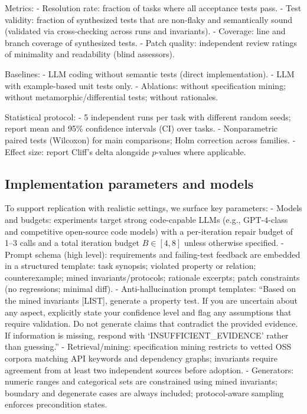 \documentclass[10pt,twocolumn]{article}
\begin{document}
Metrics:
- Resolution rate: fraction of tasks where all acceptance tests pass.
- Test validity: fraction of synthesized tests that are non-flaky and semantically sound (validated via cross-checking across runs and invariants).
- Coverage: line and branch coverage of synthesized tests.
- Patch quality: independent review ratings of minimality and readability (blind assessors).

Baselines:
- LLM coding without semantic tests (direct implementation).
- LLM with example-based unit tests only.
- Ablations: without specification mining; without metamorphic/differential tests; without rationales.

Statistical protocol:
- 5 independent runs per task with different random seeds; report mean and 95\% confidence intervals (CI) over tasks.
- Nonparametric paired tests (Wilcoxon) for main comparisons; Holm correction across families.
- Effect size: report Cliff's delta alongside $p$-values where applicable.

\subsection{Implementation parameters and models}
To support replication with realistic settings, we surface key parameters:
- Models and budgets: experiments target strong code-capable LLMs (e.g., GPT-4-class and competitive open-source code models) with a per-iteration repair budget of 1–3 calls and a total iteration budget $B \in [4,8]$ unless otherwise specified.
- Prompt schema (high level): requirements and failing-test feedback are embedded in a structured template: task synopsis; violated property or relation; counterexample; mined invariants/protocols; rationale excerpts; patch constraints (no regressions; minimal diff).
- Anti-hallucination prompt templates: ``Based on the mined invariants [LIST], generate a property test. If you are uncertain about any aspect, explicitly state your confidence level and flag any assumptions that require validation. Do not generate claims that contradict the provided evidence. If information is missing, respond with `INSUFFICIENT\_EVIDENCE' rather than guessing.''
- Retrieval/mining: specification mining restricts to vetted OSS corpora matching API keywords and dependency graphs; invariants require agreement from at least two independent sources before adoption.
- Generators: numeric ranges and categorical sets are constrained using mined invariants; boundary and degenerate cases are always included; protocol-aware sampling enforces precondition states.
\end{document}
